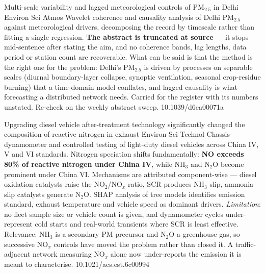 \documentclass[10pt]{article}
\begin{document}
{Multi-scale variability and lagged meteorological controls of PM$_{2.5}$ in Delhi}
{Environ Sci Atmos}
{Wavelet coherence and causality analysis of Delhi PM$_{2.5}$ against meteorological
drivers, decomposing the record by timescale rather than fitting a single regression.
\textbf{The abstract is truncated at source} --- it stops mid-sentence after stating the
aim, and no coherence bands, lag lengths, data period or station count are recoverable.
What can be said is that the method is the right one for the problem: Delhi's PM$_{2.5}$
is driven by processes on separable scales (diurnal boundary-layer collapse, synoptic
ventilation, seasonal crop-residue burning) that a time-domain model conflates, and
lagged causality is what forecasting a distributed network needs. Carried for the
register with its numbers unstated. Re-check on the weekly abstract sweep.}
{10.1039/d6ea00071a}

{Upgrading diesel vehicle after-treatment technology significantly changed the
composition of reactive nitrogen in exhaust}
{Environ Sci Technol}
{Chassis-dynamometer and controlled testing of light-duty diesel vehicles across China
IV, V and VI standards. Nitrogen speciation shifts fundamentally: \textbf{NO exceeds 80\%
of reactive nitrogen under China IV}, while NH$_3$ and N$_2$O become prominent under
China VI. Mechanisms are attributed component-wise --- diesel oxidation catalysts raise
the NO$_2$/NO$_x$ ratio, SCR produces NH$_3$ slip, ammonia-slip catalysts generate N$_2$O.
SHAP analysis of tree models identifies emission standard, exhaust temperature and vehicle
speed as dominant drivers. \emph{Limitation}: no fleet sample size or vehicle count is
given, and dynamometer cycles under-represent cold starts and real-world transients where
SCR is least effective. Relevance: NH$_3$ is a secondary-PM precursor and N$_2$O a
greenhouse gas, so successive NO$_x$ controls have moved the problem rather than closed
it. A traffic-adjacent network measuring NO$_x$ alone now under-reports the emission it
is meant to characterise.}
{10.1021/acs.est.6c00994}
\end{document}
